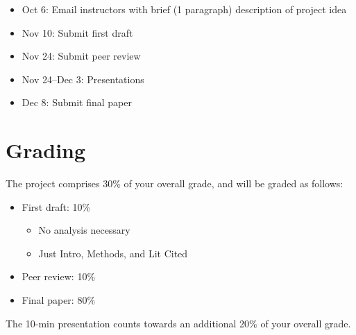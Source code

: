 \documentclass[12pt]{article}
\begin{document}
\begin{itemize}
  \item Oct 6: Email instructors with brief (1 paragraph) description
    of project idea
  \item Nov 10: Submit first draft
  \item Nov 24: Submit peer review
  \item Nov 24--Dec 3: Presentations
  \item Dec 8: Submit final paper
\end{itemize}


\section*{Grading}

The project comprises 30\% of your overall grade, and will be graded as follows:

\begin{itemize}
  \item First draft: 10\%
    \begin{itemize}
      \item No analysis necessary
      \item Just Intro, Methods, and Lit Cited
    \end{itemize}
  \item Peer review: 10\%
  \item Final paper: 80\%
\end{itemize}

The 10-min presentation counts towards an additional 20\% of your
overall grade.
\end{document}
